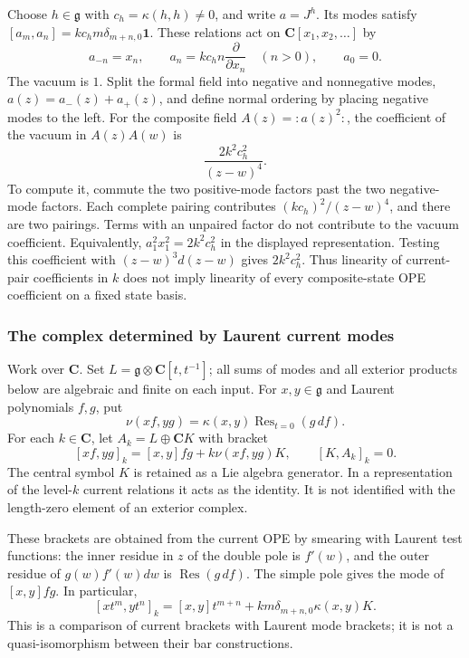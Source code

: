 \begin{example}
\label{ex:km-quadratic-level}
Choose $h\in\mathfrak g$ with $c_h=\kappa(h,h)\ne0$, and write $a=J^h$.
Its modes satisfy $[a_m,a_n]=kc_hm\delta_{m+n,0}\mathbf1$.
These relations act on $\mathbf C[x_1,x_2,\ldots]$ by
\[
a_{-n}=x_n,\qquad a_n=kc_hn\frac{\partial}{\partial x_n}\quad(n>0),
\qquad a_0=0.
\]
The vacuum is $1$.  Split the formal field into negative and nonnegative modes,
$a(z)=a_-(z)+a_+(z)$, and define normal ordering by placing negative modes
to the left.  For the composite field $A(z)={:}a(z)^2{:}$, the coefficient
of the vacuum in $A(z)A(w)$ is
\[
\frac{2k^2c_h^2}{(z-w)^4}.
\]
To compute it, commute the two positive-mode factors past the two
negative-mode factors.  Each complete pairing contributes
$(kc_h)^2/(z-w)^4$, and there are two pairings.  Terms with an unpaired
factor do not contribute to the vacuum coefficient.  Equivalently,
$a_1^2x_1^2=2k^2c_h^2$ in the displayed representation.
Testing this coefficient with $(z-w)^3d(z-w)$ gives $2k^2c_h^2$.
Thus linearity of current-pair coefficients in $k$ does not imply linearity
of every composite-state OPE coefficient on a fixed state basis.
\end{example}

\subsubsection{The complex determined by Laurent current modes}

Work over $\mathbf C$.  Set $L=\mathfrak g\otimes\mathbf C[t,t^{-1}]$;
all sums of modes and all exterior products below are algebraic and finite
on each input.  For $x,y\in\mathfrak g$ and Laurent polynomials $f,g$, put
\[
\nu(xf,yg)=\kappa(x,y)\operatorname{Res}_{t=0}(g\,df).
\]
For each $k\in\mathbf C$, let $A_k=L\oplus\mathbf CK$ with bracket
\begin{equation}\label{eq:km-mode-bracket}
[xf,yg]_k=[x,y]fg+k\nu(xf,yg)K,\qquad [K,A_k]_k=0.
\end{equation}
The central symbol $K$ is retained as a Lie algebra generator.  In a
representation of the level-$k$ current relations it acts as the identity.
It is not identified with the length-zero element of an exterior complex.

These brackets are obtained from the current OPE by smearing with Laurent
test functions: the inner residue in $z$ of the double pole is $f'(w)$,
and the outer residue of $g(w)f'(w)dw$ is $\operatorname{Res}(g\,df)$.
The simple pole gives the mode of $[x,y]fg$.  In particular,
\[
[xt^m,yt^n]_k=[x,y]t^{m+n}
+km\delta_{m+n,0}\kappa(x,y)K.
\]
This is a comparison of current brackets with Laurent mode brackets;
it is not a quasi-isomorphism between their bar constructions.

